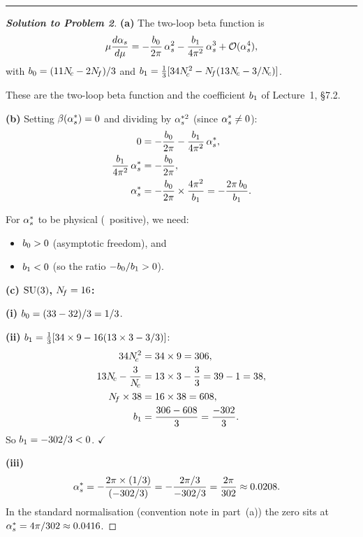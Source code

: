 \documentclass[11pt,a4paper]{article}
\begin{document}
\bigskip
\hrule
\bigskip

\begin{proof}[\textbf{Solution to Problem 2}]

\textbf{(a)} The two-loop beta function is
\[
  \mu\frac{d\alpha_s}{d\mu}
  = -\frac{b_0}{2\pi}\,\alpha_s^2
    - \frac{b_1}{4\pi^2}\,\alpha_s^3
  + \mathcal{O}(\alpha_s^4),
\]
with $b_0 = (11N_{\!c} - 2N_{\!f})/3$ and
$b_1 = \frac{1}{3}[34N_{\!c}^2 - N_{\!f}(13N_{\!c} - 3/N_{\!c})]$.

These are the two-loop beta function and the coefficient $b_1$ of
Lecture~1, \S7.2.

\textbf{(b)} Setting $\beta(\alpha_s^*) = 0$ and dividing by $\alpha_s^{*2}$
(since $\alpha_s^* \neq 0$):
\begin{align}
  0 &= -\frac{b_0}{2\pi} - \frac{b_1}{4\pi^2}\,\alpha_s^*, \\
  \frac{b_1}{4\pi^2}\,\alpha_s^* &= -\frac{b_0}{2\pi}, \\
  \alpha_s^* &= -\frac{b_0}{2\pi} \times \frac{4\pi^2}{b_1}
  = -\frac{2\pi\,b_0}{b_1}.
  \label{eq:bz-derivation}
\end{align}

For $\alpha_s^*$ to be physical (\ie\ positive), we need:
\begin{itemize}
  \item $b_0 > 0$ (asymptotic freedom), and
  \item $b_1 < 0$ (so the ratio $-b_0/b_1 > 0$).
\end{itemize}

\textbf{(c) $\mathrm{SU}(3)$, $N_{\!f} = 16$:}

\textbf{(i)} $b_0 = (33 - 32)/3 = 1/3$.

\textbf{(ii)} $b_1 = \frac{1}{3}[34 \times 9 - 16(13 \times 3 - 3/3)]$:
\begin{align}
  34N_{\!c}^2 &= 34 \times 9 = 306, \\
  13N_{\!c} - \frac{3}{N_{\!c}} &= 13 \times 3 - \frac{3}{3} = 39 - 1 = 38, \\
  N_{\!f} \times 38 &= 16 \times 38 = 608, \\
  b_1 &= \frac{306 - 608}{3} = \frac{-302}{3}.
\end{align}
So $b_1 = -302/3 < 0$. \quad$\checkmark$

\textbf{(iii)}
\begin{align}
  \alpha_s^* &= -\frac{2\pi \times (1/3)}{(-302/3)}
  = -\frac{2\pi/3}{-302/3}
  = \frac{2\pi}{302}
  \approx 0.0208.
\end{align}
In the standard normalisation (convention note in part~(a)) the zero sits
at $\alpha_s^* = 4\pi/302 \approx 0.0416$.


\end{proof}
\end{document}
